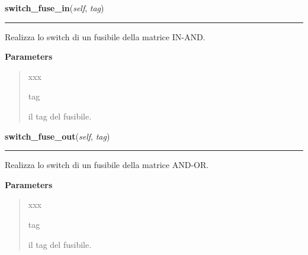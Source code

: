     \label{pla:Pla:switch_fuse_in}

    \vspace{0.5ex}

\hspace{.8\funcindent}\begin{boxedminipage}{\funcwidth}

    \raggedright \textbf{switch\_fuse\_in}(\textit{self}, \textit{tag})

    \vspace{-1.5ex}

    \rule{\textwidth}{0.5\fboxrule}
\setlength{\parskip}{2ex}
    Realizza lo switch di un fusibile della matrice IN-AND.

\setlength{\parskip}{1ex}
      \textbf{Parameters}
      \vspace{-1ex}

      \begin{quote}
        \begin{Ventry}{xxx}

          \item[tag]

          il tag del fusibile.

        \end{Ventry}

      \end{quote}

    \end{boxedminipage}

    \label{pla:Pla:switch_fuse_out}

    \vspace{0.5ex}

\hspace{.8\funcindent}\begin{boxedminipage}{\funcwidth}

    \raggedright \textbf{switch\_fuse\_out}(\textit{self}, \textit{tag})

    \vspace{-1.5ex}

    \rule{\textwidth}{0.5\fboxrule}
\setlength{\parskip}{2ex}
    Realizza lo switch di un fusibile della matrice AND-OR.

\setlength{\parskip}{1ex}
      \textbf{Parameters}
      \vspace{-1ex}

      \begin{quote}
        \begin{Ventry}{xxx}

          \item[tag]

          il tag del fusibile.

        \end{Ventry}

      \end{quote}

    \end{boxedminipage}

